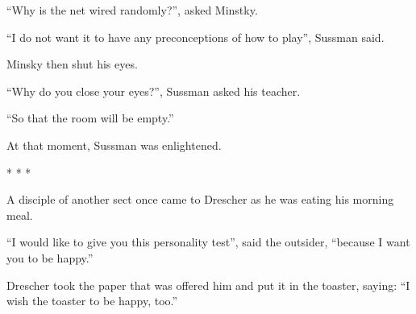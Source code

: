 ``Why is the net wired randomly?'', asked Minstky.

``I do not want it to have any preconceptions of how to play'', Sussman said.

Minsky then shut his eyes.

``Why do you close your eyes?'', Sussman asked his teacher.

``So that the room will be empty.''

At that moment, Sussman was enlightened.

\begin{center}* * *\end{center}

A disciple of another sect once came to Drescher as he was eating his morning meal.

``I would like to give you this personality test'', said the outsider, ``because I want you to be happy.''

Drescher took the paper that was offered him and put it in the toaster, saying: ``I wish the toaster to be happy, too.''

